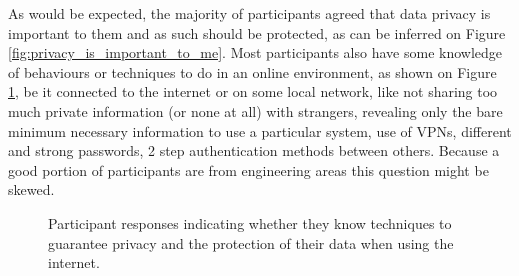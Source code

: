 As would be expected, the majority of participants agreed that data privacy
is important to them and as such should be protected, as can be inferred
on Figure \ref*{fig:privacy_is_important_to_me}. Most participants
also have some knowledge of behaviours or techniques to do
in an online environment, as shown on Figure \ref*{fig:techniques_to_guarantee_privacy}, be it connected to the internet or on some
local network, like not sharing too much private information
(or none at all) with strangers, revealing only the bare minimum necessary
information to use a particular system, use of VPNs, different and strong
passwords, 2 step authentication methods between others. Because a good
portion of participants are from engineering areas this question might be
skewed.

\begin{figure}
    \begin{center}
        \caption{Participant responses indicating whether they know techniques to guarantee privacy and the protection of their data when using the internet.}
        \label{fig:techniques_to_guarantee_privacy}
    \end{center}
\end{figure}

